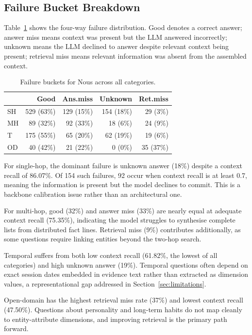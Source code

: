 \documentclass[11pt,a4paper,twocolumn]{article}
\begin{document}
\subsection{Failure Bucket Breakdown}

Table~\ref{tab:buckets} shows the four-way failure distribution. Good denotes
a correct answer; answer miss means context was present but the LLM answered
incorrectly; unknown means the LLM declined to answer despite relevant context
being present; retrieval miss means relevant information was absent from the
assembled context.

\begin{table}[h!]
\centering
\small
\caption{Failure buckets for Nous across all categories.}
\label{tab:buckets}
\renewcommand{\arraystretch}{1.2}
\setlength{\tabcolsep}{3pt}
\begin{tabular}{lrrrr}
\toprule
 & Good & Ans.miss & Unknown & Ret.miss \\
\midrule
SH  & 529 (63\%) & 129 (15\%) & 154 (18\%) & 29 (3\%) \\
MH  &  89 (32\%) &  92 (33\%) &  18 (6\%)  & 24 (9\%) \\
T   & 175 (55\%) &  65 (20\%) &  62 (19\%) & 19 (6\%) \\
OD  &  40 (42\%) &  21 (22\%) &   0 (0\%)  & 35 (37\%) \\
\bottomrule
\end{tabular}
\end{table}

For single-hop, the dominant failure is unknown answer (18\%) despite a
context recall of 86.07\%. Of 154 such failures, 92 occur when context recall
is at least 0.7, meaning the information is present but the model declines to
commit. This is a backbone calibration issue rather than an architectural one.

For multi-hop, good (32\%) and answer miss (33\%) are nearly equal at adequate
context recall (75.35\%), indicating the model struggles to synthesise complete
lists from distributed fact lines. Retrieval miss (9\%) contributes
additionally, as some questions require linking entities beyond the two-hop
search.

Temporal suffers from both low context recall (61.82\%, the lowest of all
categories) and high unknown answer (19\%). Temporal questions often depend on
exact session dates embedded in evidence text rather than extracted as dimension
values, a representational gap addressed in Section~\ref{sec:limitations}.

Open-domain has the highest retrieval miss rate (37\%) and lowest context
recall (47.50\%). Questions about personality and long-term habits do not map
cleanly to entity-attribute dimensions, and improving retrieval is the primary
path forward.
\end{document}

